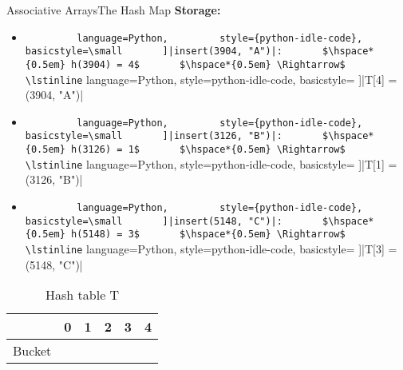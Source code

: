 \begin{frame}{Associative Arrays}{The Hash Map}
  \textbf{Storage:}
  \begin{itemize}
    \item
      \lstinline[
        language=Python,
        style={python-idle-code},
        basicstyle=\small
      ]|insert(3904, "A")|:
      $\hspace*{0.5em} h(3904) = 4$
      $\hspace*{0.5em} \Rightarrow$
      \lstinline[
        language=Python,
        style={python-idle-code},
        basicstyle=\small
      ]|T[4] = (3904, "A")|
    \item
      \lstinline[
        language=Python,
        style={python-idle-code},
        basicstyle=\small
      ]|insert(3126, "B")|:
      $\hspace*{0.5em} h(3126) = 1$
      $\hspace*{0.5em} \Rightarrow$
      \lstinline[
        language=Python,
        style={python-idle-code},
        basicstyle=\small
      ]|T[1] = (3126, "B")|
    \item
      \lstinline[
        language=Python,
        style={python-idle-code},
        basicstyle=\small
      ]|insert(5148, "C")|:
      $\hspace*{0.5em} h(5148) = 3$
      $\hspace*{0.5em} \Rightarrow$
      \lstinline[
        language=Python,
        style={python-idle-code},
        basicstyle=\small
      ]|T[3] = (5148, "C")|
  \end{itemize}
  \vspace*{-1.0em}
  \begin{table}[!b]
    \caption{Hash table T}
    \label{tab:hash_table:example_introduction}
    \begin{tabularx}{0.875\textwidth}{l|ccccc}
      {} & 0 & 1 & 2 & 3 & 4\\
      \midrule
      Bucket &
      {} &
      \lstinline[
        language=Python,
        style={python-idle-code},
        basicstyle=\small
      ]|(3126, "B")| &
      {} &
      \lstinline[
        language=Python,
        style={python-idle-code},
        basicstyle=\small
      ]|(5148, "C")| &
      \lstinline[
        language=Python,
        style={python-idle-code},
        basicstyle=\small
      ]|(3904, "A")|
    \end{tabularx}
  \end{table}
\end{frame}

